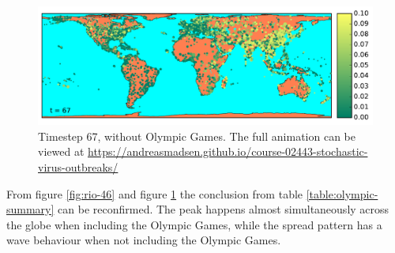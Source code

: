 \begin{figure}[H]
	\centering
	\includegraphics[width=1.0 \linewidth]{plots/gifs/frames/noRio-67}
	\caption{Timestep 67, without Olympic Games. The full animation can be viewed at
		\url{https://andreasmadsen.github.io/course-02443-stochastic-virus-outbreaks/}}
	\label{fig:noRio-67}
\end{figure}

From figure \ref{fig:rio-46} and figure \ref{fig:noRio-67} the conclusion from table \ref{table:olympic-summary} can be reconfirmed. The peak happens almost simultaneously across the globe when including the Olympic Games, while the spread pattern has a wave behaviour when not including the Olympic Games.
